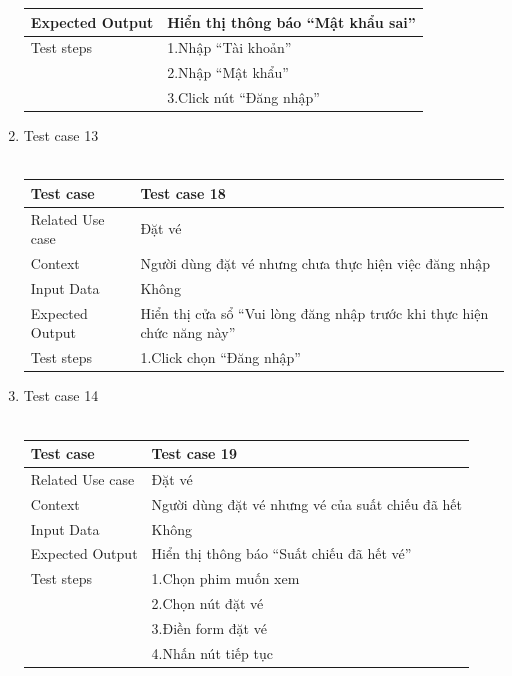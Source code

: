 \documentclass[a4paper, 12pt]{article}
\begin{document}
\begin{enumerate}
\begin{tabular}{|l|l|}
			\hline
			Expected Output&
			Hiển thị thông báo “Mật khẩu sai”\\
			\hline
			Test steps&
			1.Nhập “Tài khoản”\\&
			2.Nhập “Mật khẩu”\\&
			3.Click nút “Đăng nhập”\\					
			\hline
		\end{tabular}
		\item Test case 13\\\\
		\begin{tabular}{|l|l|}
			\hline
			Test case&
			Test case 18\\
			\hline
			Related Use case&
			Đặt vé\\
			\hline
			Context&
			Người dùng đặt vé nhưng chưa thực hiện việc đăng nhập\\
			\hline
			Input Data&
			Không\\
			\hline
			Expected Output&
			Hiển thị cửa sổ “Vui lòng đăng nhập trước khi thực hiện chức năng này”\\
			\hline
			Test steps&
			1.Click chọn “Đăng nhập”\\					
			\hline
		\end{tabular}
		\item Test case 14\\\\
		\begin{tabular}{|l|l|}
			\hline
			Test case&
			Test case 19\\
			\hline
			Related Use case&
			Đặt vé\\
			\hline
			Context&
			Người dùng đặt vé nhưng vé của suất chiếu đã hết\\
			\hline
			Input Data&
			Không\\
			\hline
			Expected Output&
			Hiển thị thông báo “Suất chiếu đã hết vé”\\
			
			\hline
			Test steps&
			1.Chọn phim muốn xem\\&
			2.Chọn nút đặt vé\\&
			3.Điền form đặt vé\\&
			4.Nhấn nút tiếp tục\\
								
			\hline
		\end{tabular}
		
	
	
	
	\end{enumerate}
\end{document}
